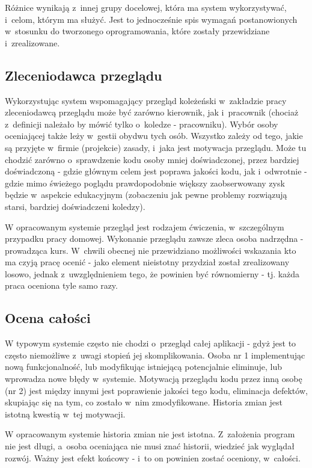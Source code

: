 Różnice wynikają z~innej grupy docelowej, która ma system wykorzystywać, i~celom, którym ma służyć. Jest to jednocześnie spis wymagań postanowionych w~stosunku do tworzonego oprogramowania, które zostały przewidziane i~zrealizowane.

\subsection{Zleceniodawca przeglądu}
Wykorzystując system wspomagający przegląd koleżeński w~zakładzie pracy zleceniodawcą przeglądu może być zarówno kierownik, jak i~pracownik (chociaż z~definicji należało by mówić tylko o~koledze - pracowniku). Wybór osoby oceniającej także leży w~gestii obydwu tych osób. Wszystko zależy od tego, jakie są przyjęte w~firmie (projekcie) zasady, i~jaka jest motywacja przeglądu. Może tu chodzić zarówno o~sprawdzenie kodu osoby mniej doświadczonej, przez bardziej doświadczoną - gdzie głównym celem jest poprawa jakości kodu, jak i~odwrotnie - gdzie mimo świeżego poglądu prawdopodobnie większy zaobserwowany zysk będzie w~aspekcie edukacyjnym (zobaczeniu jak pewne problemy rozwiązują starsi, bardziej doświadczeni koledzy).

\medskip
W opracowanym systemie przegląd jest rodzajem ćwiczenia, w~szczególnym przypadku pracy domowej. Wykonanie przeglądu zawsze zleca osoba nadrzędna - prowadząca kurs. W~chwili obecnej nie przewidziano możliwości wskazania kto ma czyją pracę ocenić - jako element nieistotny przydział został zrealizowany losowo, jednak z~uwzględnieniem tego, że powinien być równomierny - tj. każda praca oceniona tyle samo razy.

\subsection{Ocena całości}
W typowym systemie często nie chodzi o~przegląd całej aplikacji - gdyż jest to często niemożliwe z~uwagi stopień jej skomplikowania. Osoba nr 1 implementując nową funkcjonalność, lub modyfikując istniejącą potencjalnie eliminuje, lub wprowadza nowe błędy w~systemie. Motywacją przeglądu kodu przez inną osobę (nr 2) jest między innymi jest poprawienie jakości tego kodu, eliminacja defektów, skupiając się na tym, co zostało w~nim zmodyfikowane. Historia zmian jest istotną kwestią w~tej motywacji.

\medskip
W opracowanym systemie historia zmian nie jest istotna. Z~założenia program nie jest długi, a~osoba oceniająca nie musi znać historii, wiedzieć jak wyglądał rozwój. Ważny jest efekt końcowy - i~to on powinien zostać oceniony, w~całości.

